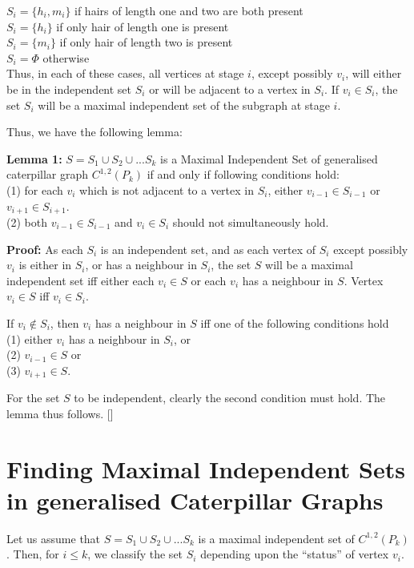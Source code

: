 \documentclass[10pt]{article}
\begin{document}
\noindent $S_i= \{h_i,m_i\}$  if hairs of length one
and two are both present \\ $S_i=\{h_i\}$  if only hair of length one
is present \\ $S_i=\{m_i\}$  if only hair of length two is present \\
$S_i=\Phi$ otherwise\\

Thus, in each of these cases, all vertices at stage $i$, except possibly
$v_i$, will either be in the independent set $S_i$ or will be adjacent to
a vertex in $S_i$. If $v_i\in S_i$, the set $S_i$ will be a maximal
independent set of the subgraph at stage $i$.

Thus, we have the following lemma:

{\textbf{Lemma 1:}} $S=S_1 \cup S_2 \cup ...  S_k$ is a Maximal
Independent Set of generalised caterpillar graph $C^{1,2}(P_k)$ if and
only if following conditions hold: \\ (1) for each $v_i$ which is not
adjacent to a vertex in $S_i$, either $v_{i-1}\in S_{i-1}$ or $v_{i+1}\in
S_{i+1}$.\\ (2) both $v_{i-1}\in S_{i-1}$ and $v_i\in S_i$ should not
simultaneously hold.

{\textbf{Proof:}} As each $S_i$ is an independent set, and as each vertex
of $S_i$ except possibly $v_i$ is either in $S_i$, or has a neighbour in
$S_i$, the set $S$ will be a maximal independent set iff either each
$v_i\in S$ or each $v_i$ has a neighbour in $S$.  Vertex $v_i\in S$ iff
$v_i\in S_i$.

If $v_i\not\in S_i$, then $v_i$ has a neighbour in $S$ iff one of the
following conditions hold\\ (1) either $v_i$ has a neighbour in $S_i$,
or\\ (2) $v_{i-1}\in S$ or\\ (3) $v_{i+1} \in S$.

For the set $S$ to be independent, clearly the second condition must
hold. The lemma thus follows. []

\section{Finding Maximal Independent Sets in generalised Caterpillar
Graphs}

Let us assume that $S=S_1 \cup S_2 \cup ...  S_k$ is a maximal
independent set of $C^{1,2}(P_k)$.  
Then, for $i \leq k$, we classify the set $S_i$ depending upon the
``status'' of vertex $v_i$.\\
\end{document}
